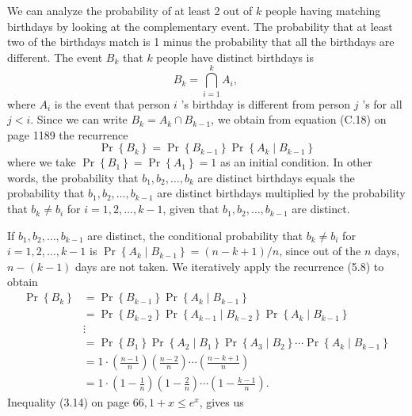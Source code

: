 \documentclass[lang=cn,newtx,10pt,scheme=chinese]{elegantbook}
\begin{document}
We can analyze the probability of at least 2 out of $k$ people having matching birthdays by looking at the complementary event. The probability that at least two of the birthdays match is 1 minus the probability that all the birthdays are different. The event $B_k$ that $k$ people have distinct birthdays is
$$
B_k=\bigcap_{i=1}^k A_i \text {, }
$$
where $A_i$ is the event that person $i$ 's birthday is different from person $j$ 's for all $j<i$. Since we can write $B_k=A_k \cap B_{k-1}$, we obtain from equation (C.18) on page 1189 the recurrence
$$
\operatorname{Pr}\left\{B_k\right\}=\operatorname{Pr}\left\{B_{k-1}\right\} \operatorname{Pr}\left\{A_k \mid B_{k-1}\right\}
$$
where we take $\operatorname{Pr}\left\{B_1\right\}=\operatorname{Pr}\left\{A_1\right\}=1$ as an initial condition. In other words, the probability that $b_1, b_2, \ldots, b_k$ are distinct birthdays equals the probability that $b_1, b_2, \ldots, b_{k-1}$ are distinct birthdays multiplied by the probability that $b_k \neq b_i$ for $i=1,2, \ldots, k-1$, given that $b_1, b_2, \ldots, b_{k-1}$ are distinct.

If $b_1, b_2, \ldots, b_{k-1}$ are distinct, the conditional probability that $b_k \neq b_i$ for $i=1,2, \ldots, k-1$ is $\operatorname{Pr}\left\{A_k \mid B_{k-1}\right\}=(n-k+1) / n$, since out of the $n$ days, $n-(k-1)$ days are not taken. We iteratively apply the recurrence (5.8) to obtain
$$
\begin{aligned}
\operatorname{Pr}\left\{B_k\right\} & =\operatorname{Pr}\left\{B_{k-1}\right\} \operatorname{Pr}\left\{A_k \mid B_{k-1}\right\} \\
& =\operatorname{Pr}\left\{B_{k-2}\right\} \operatorname{Pr}\left\{A_{k-1} \mid B_{k-2}\right\} \operatorname{Pr}\left\{A_k \mid B_{k-1}\right\} \\
& \vdots \\
& =\operatorname{Pr}\left\{B_1\right\} \operatorname{Pr}\left\{A_2 \mid B_1\right\} \operatorname{Pr}\left\{A_3 \mid B_2\right\} \cdots \operatorname{Pr}\left\{A_k \mid B_{k-1}\right\} \\
& =1 \cdot\left(\frac{n-1}{n}\right)\left(\frac{n-2}{n}\right) \cdots\left(\frac{n-k+1}{n}\right) \\
& =1 \cdot\left(1-\frac{1}{n}\right)\left(1-\frac{2}{n}\right) \cdots\left(1-\frac{k-1}{n}\right) .
\end{aligned}
$$
Inequality (3.14) on page $66,1+x \leq e^x$, gives us
\end{document}
